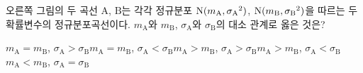 \noindent\begin{minipage}[t]{0.58\linewidth}\vspace{0pt}\raggedright 오른쪽 그림의 두 곡선 $\mathrm{A}$, $\mathrm{B}$는 각각 정규분포 $\mathrm{N}(m_{\mathrm{A}}{,}\mkern3mu\mathopen{}{\sigma_{\mathrm{A}}}^2)$, $\mathrm{N}(m_{\mathrm{B}}{,}\mkern3mu\mathopen{}{\sigma_{\mathrm{B}}}^2)$을 따르는 두 확률변수의 정규분포곡선이다. $m_{\mathrm{A}}$와 $m_{\mathrm{B}}$, $\sigma_{\mathrm{A}}$와 $\sigma_{\mathrm{B}}$의 대소 관계로 옳은 것은?\end{minipage}\hfill\begin{minipage}[t]{0.4\linewidth}\vspace{0pt}\centering \resizebox{\ifdim\width>\linewidth\linewidth\else\width\fi}{!}{}\end{minipage}\par
\begin{choicesii}{$m_{\mathrm{A}}=m_{\mathrm{B}}$, $\sigma_{\mathrm{A}}>\sigma_{\mathrm{B}}$}{$m_{\mathrm{A}}=m_{\mathrm{B}}$, $\sigma_{\mathrm{A}}<\sigma_{\mathrm{B}}$}{$m_{\mathrm{A}}>m_{\mathrm{B}}$, $\sigma_{\mathrm{A}}>\sigma_{\mathrm{B}}$}{$m_{\mathrm{A}}>m_{\mathrm{B}}$, $\sigma_{\mathrm{A}}<\sigma_{\mathrm{B}}$}{$m_{\mathrm{A}}<m_{\mathrm{B}}$, $\sigma_{\mathrm{A}}=\sigma_{\mathrm{B}}$}\end{choicesii}
